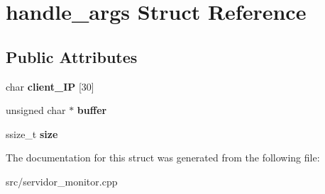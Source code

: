 \hypertarget{structhandle__args}{}\section{handle\+\_\+args Struct Reference}
\label{structhandle__args}
\subsection*{Public Attributes}
\begin{DoxyCompactItemize}
\item 
\mbox{\label{structhandle__args_a0a9741615f3d0a63392452821681d911}} 
char {\bfseries client\+\_\+\+IP} \mbox{[}30\mbox{]}
\item 
\mbox{\label{structhandle__args_a88a11a9eee69d22c4ff6df30e65a2c72}} 
unsigned char $\ast$ {\bfseries buffer}
\item 
\mbox{\label{structhandle__args_a5b41283a33534b69c635d9a91d37d154}} 
ssize\+\_\+t {\bfseries size}
\end{DoxyCompactItemize}


The documentation for this struct was generated from the following file\+:\begin{DoxyCompactItemize}
\item 
src/servidor\+\_\+monitor.\+cpp\end{DoxyCompactItemize}
